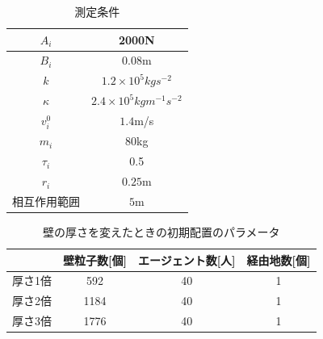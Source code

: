 \begin{table}[t]
  \begin{center}
    \caption{測定条件}
    \label{tb:result_para}
    \begin{tabular}{c|c}
      \hline \hline
      $A_i$            & 2000N                              \\ \hline 
      $B_i$            & 0.08m                              \\ \hline 
      $k$              & $1.2 \times 10^5 kg s^{-2} $       \\ \hline 
      $\kappa$         & $2.4 \times 10^5 kg m^{-1} s^{-2}$ \\ \hline 
      $v_i^0$          & $1.4$m/s                           \\ \hline 
      $m_i$            & $80$kg                             \\ \hline 
      $\tau_i$         & 0.5                               \\ \hline 
      $r_i$            & $0.25$m                            \\ \hline 
      相互作用範囲     & $5$m                              \\ \hline 
    \end{tabular}
  \end{center}
\end{table}


\begin{table}
  \begin{center}
    \caption{壁の厚さを変えたときの初期配置のパラメータ}
    \label{tb:haba_atusa}
    \begin{tabular}{c|c|c|c}
      \hline \hline
            & 壁粒子数[個] & エージェント数[人] & 経由地数[個] \\ \hline
      厚さ1倍 & 592  & 40 & 1 \\ \hline
      厚さ2倍 & 1184 & 40 & 1 \\ \hline
      厚さ3倍 & 1776 & 40 & 1 \\ \hline
    \end{tabular}
  \end{center}
\end{table}



\clearpage


